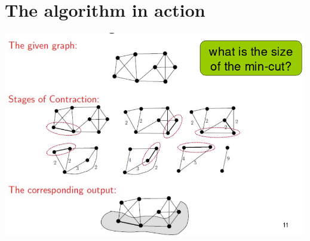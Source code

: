 \documentclass{article}[18pt]
\begin{document}
\section{The algorithm in action}
\begin{center}
	\includegraphics[scale=0.7]{in_action}
\end{center}
\end{document}
